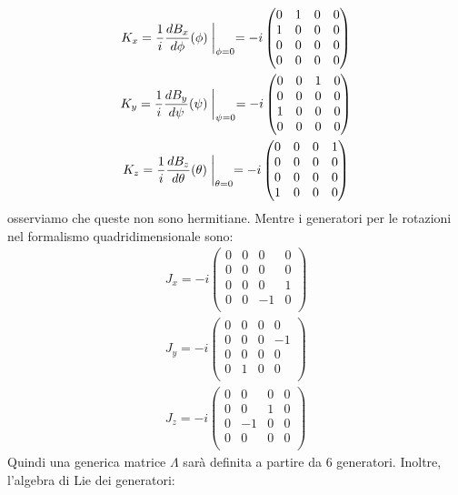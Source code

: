 \begin{equation}
\begin{gathered}
    K_x=\dfrac{1}{i}\dfrac{dB_x}{d\phi}(\phi)\biggm|_{\phi=0}= 
   -i \begin{pmatrix}
         0&1&0&0  \\
  1&0&0&0\\
0&0&0&0\\
0&0&0&0\\
    \end{pmatrix}\\
      K_y=\dfrac{1}{i}\dfrac{dB_y}{d\psi}(\psi)\biggm|_{\psi=0}= 
   -i \begin{pmatrix}
         0&0&1&0  \\
  0&0&0&0\\
1&0&0&0\\
0&0&0&0\\
    \end{pmatrix}\\
      K_z=\dfrac{1}{i}\dfrac{dB_z}{d\theta}(\theta)\biggm|_{\theta=0}= 
   -i \begin{pmatrix}
         0&0&0&1 \\
  0&0&0&0\\
0&0&0&0\\
1&0&0&0\\
    \end{pmatrix}
\end{gathered}
\end{equation}
osserviamo che queste non sono hermitiane. Mentre i generatori per le rotazioni nel formalismo quadridimensionale sono:
\begin{equation}
\begin{gathered}
    J_x= -i
    \begin{pmatrix}
         0&0&0&0\\
  0&0&0&0\\
0&0&0&1\\
0&0&-1&0\\
    \end{pmatrix}
\\
    J_y= -i
   \begin{pmatrix}
         0&0&0&0\\
  0&0&0&-1\\
0&0&0&0\\
0&1&0&0\\
    \end{pmatrix}\\
     J_z=-i 
    \begin{pmatrix}
         0&0&0&0\\
  0&0&1&0\\
0&-1&0&0\\
0&0&0&0\\
    \end{pmatrix}
    \end{gathered}
\end{equation}
Quindi una generica matrice $\Lambda$ sarà definita a partire da 6 generatori.
Inoltre, l'algebra di Lie dei generatori:

